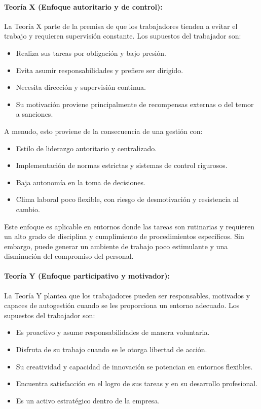 \documentclass[a4paper,oneside,11pt]{article}
\begin{document}
\paragraph{\textbf{Teoría X (Enfoque autoritario y de control):}}

La Teoría X parte de la premisa de que los trabajadores tienden a evitar el trabajo y requieren supervisión constante. Los supuestos del trabajador son:
\begin{itemize}
    \item Realiza sus tareas por obligación y bajo presión.
    \item Evita asumir responsabilidades y prefiere ser dirigido.
    \item Necesita dirección y supervisión continua.
    \item Su motivación proviene principalmente de recompensas externas o del temor a sanciones.
\end{itemize}

A menudo, esto proviene de la consecuencia de una gestión con:

\begin{itemize}
    \item Estilo de liderazgo autoritario y centralizado.
    \item Implementación de normas estrictas y sistemas de control rigurosos.
    \item Baja autonomía en la toma de decisiones.
    \item Clima laboral poco flexible, con riesgo de desmotivación y resistencia al cambio.
\end{itemize}

Este enfoque es aplicable en entornos donde las tareas son rutinarias y requieren un alto grado de disciplina y cumplimiento de procedimientos específicos. Sin embargo, puede generar un ambiente de trabajo poco estimulante y una disminución del compromiso del personal.


\paragraph{\textbf{Teoría Y (Enfoque participativo y motivador):}}

La Teoría Y plantea que los trabajadores pueden ser responsables, motivados y capaces de autogestión cuando se les proporciona un entorno adecuado. Los supuestos del trabajador son:


\begin{itemize}
    \item Es proactivo y asume responsabilidades de manera voluntaria.
    \item Disfruta de su trabajo cuando se le otorga libertad de acción.
    \item Su creatividad y capacidad de innovación se potencian en entornos flexibles.
    \item Encuentra satisfacción en el logro de sus tareas y en su desarrollo profesional.
    \item Es un activo estratégico dentro de la empresa.
\end{itemize}
\end{document}
